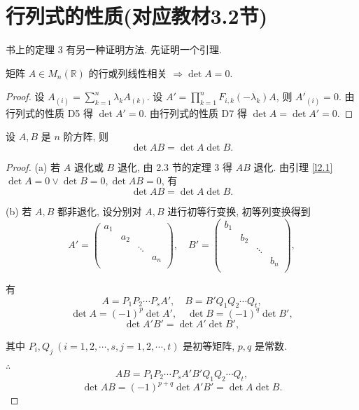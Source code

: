 \documentclass{ctexart}
\begin{document}
\section{行列式的性质(对应教材3.2节)}
书上的定理 3 有另一种证明方法. 先证明一个引理.
\begin{lemma}\label{l2.1}
    矩阵 $A\in M_n(\mathbb{R})$ 的行或列线性相关 $\Rightarrow\det A=0$.
\end{lemma}
\begin{proof}
    设 $A_{(i)}=\sum\limits_{k=1}^n\lambda_kA_{(k)}$. 设 $A'=\prod\limits_{k=1}^nF_{i,k}(-\lambda_{k})A$, 则 $A'_{(i)}=0$. 由行列式的性质 D5 得 $\det A'=0$. 由行列式的性质 D7 得 $\det A=\det A'=0.$
\end{proof}
\begin{theorem}[书上的定理 3]
    设 $A,B$ 是 $n$ 阶方阵, 则
    \[\det AB=\det A\det B.\]
\end{theorem}
\begin{proof}
    (a) 若 $A$ 退化或 $B$ 退化, 由 2.3 节的定理 3 得 $AB$ 退化. 由引理 \ref{l2.1} $\det A=0\vee\det B=0,\det AB=0$, 有
    \[\det AB=\det A\det B.\]

    (b) 若 $A,B$ 都非退化, 设分别对 $A,B$ 进行初等行变换, 初等列变换得到
    \[A'=\begin{pmatrix}
        a_{1} \\
        & a_{2} \\
        && \ddots \\
        &&& a_{n} \\
    \end{pmatrix},\quad B'=\begin{pmatrix}
        b_{1} \\
        & b_{2} \\
        && \ddots \\
        &&& b_{n} \\
    \end{pmatrix},\]

    有
    \[A=P_1P_2\cdots P_sA',\quad B=B'Q_1Q_2\cdots Q_t,\]
    \[\det A=(-1)^p\det A',\quad\det B=(-1)^q\det B',\]
    \[\det A'B'=\det A'\det B',\]

    其中 $P_i,Q_j\ (i=1,2,\cdots,s,j=1,2,\cdots,t)$ 是初等矩阵, $p,q$ 是常数.

    $\therefore$
    \[AB=P_1P_2\cdots P_sA'B'Q_1Q_2\cdots Q_t,\]
    \[\det AB=(-1)^{p+q}\det A'B'=\det A\det B.\]
\end{proof}
\end{document}
